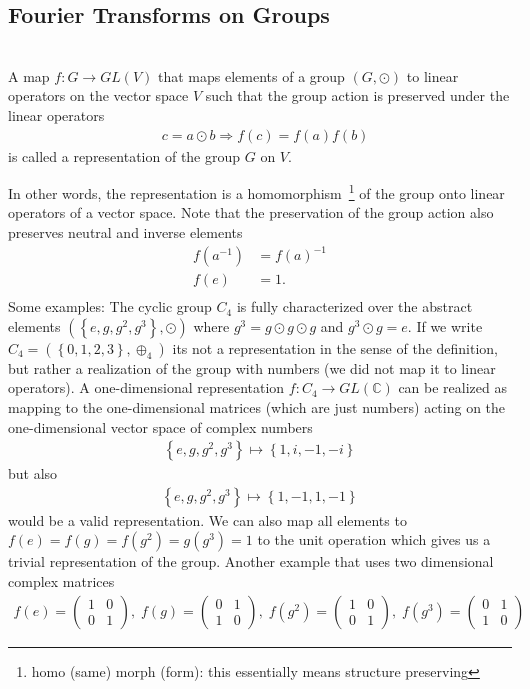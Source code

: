 \subsection{Fourier Transforms on Groups}

\begin{def*} \phantom{...}\\
A map $f: G \rightarrow GL(V)$ that maps elements of a group $(G,\odot)$ to linear operators on the vector space $V$ such that the group action is preserved under the linear operators
\begin{align*}
    &c=a\odot b \Rightarrow f(c)=f(a)f(b) 
\end{align*}
is called a representation of the group $G$ on $V$. 
\end{def*}
In other words, the representation is a homomorphism~\footnote{homo (same) morph (form): this essentially means structure preserving} of the group onto linear operators of a vector space. Note that the preservation of the group action also preserves neutral and inverse elements
\begin{align*}
f(a^{-1}) &= f(a)^{-1}\\
    f(e) &= 1.\\
\end{align*}
Some examples:
The cyclic group $C_4$ is fully characterized over the abstract elements $(\left\{e,g,g^2,g^3\right\}, \odot)$ where $g^3 = g\odot g \odot g$ and $g^3\odot g=e$. If we write $C_4=(\left\{0,1,2,3\right\},\oplus_4)$ its not a representation in the sense of the definition, but rather a realization of the group with numbers (we did not map it to linear operators). A one-dimensional representation $f:C_4 \rightarrow GL(\mathbb{C})$ can be realized as mapping to the one-dimensional matrices (which are just numbers) acting on the one-dimensional vector space of complex numbers
\begin{align}
    \left\{e,g,g^2,g^3\right\} \mapsto \left\{1,i,-1,-i\right\}
\end{align}
but also 
\begin{align}
    \left\{e,g,g^2,g^3\right\} \mapsto \left\{1,-1,1,-1\right\}
\end{align}
would be a valid representation. We can also map all elements to $f(e)=f(g)=f(g^2)=g(g^3)=1$ to the unit operation which gives us a trivial representation of the group. Another example that uses two dimensional complex matrices
\begin{align}
f(e) = \begin{pmatrix}
    1 & 0 \\ 0 & 1 \end{pmatrix}, \; f(g) = \begin{pmatrix}
    0 & 1 \\ 1 & 0 \end{pmatrix},\; f(g^2)=\begin{pmatrix}
    1 & 0 \\ 0 & 1 \end{pmatrix}, \; f(g^3)=\begin{pmatrix}
    0 & 1 \\ 1 & 0 \end{pmatrix}
\end{align}
